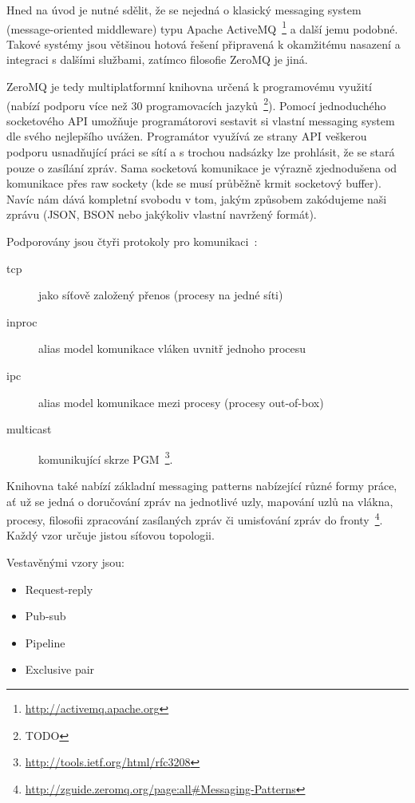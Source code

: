 \documentclass[thesis=M,czech]{FITthesis}[2014/05/07]
\begin{document}
Hned na úvod je nutné sdělit, že se nejedná o klasický messaging system (message-oriented middleware) typu Apache ActiveMQ~\footnote{\url{http://activemq.apache.org}} a další jemu podobné. Takové systémy jsou většinou hotová řešení připravená k okamžitému nasazení a integraci s dalšími službami, zatímco filosofie ZeroMQ je jiná.

ZeroMQ je tedy multiplatformní knihovna určená k programovému využití (nabízí podporu více než 30 programovacích jazyků~\footnote{TODO}). Pomocí jednoduchého socketového API umožňuje programátorovi sestavit si vlastní messaging system dle svého nejlepšího uvážen. Programátor využívá ze strany API veškerou podporu usnadňující práci se sítí a s trochou nadsázky lze prohlásit, že se stará pouze o zasílání zpráv. Sama socketová komunikace je výrazně zjednodušena od komunikace přes raw sockety (kde se musí průběžně krmit socketový buffer). Navíc nám dává kompletní svobodu v tom, jakým způsobem zakódujeme naši zprávu (JSON, BSON nebo jakýkoliv vlastní navržený formát).

Podporovány jsou čtyři protokoly pro komunikaci~\cite{zeromq1}:

\begin{description}
	\item[tcp] jako síťově založený přenos (procesy na jedné síti)
	\item[inproc] alias model komunikace vláken uvnitř jednoho procesu
	\item[ipc] alias model komunikace mezi procesy (procesy out-of-box)
	\item[multicast]	komunikující skrze PGM~\footnote{\url{http://tools.ietf.org/html/rfc3208}}.
\end{description}

Knihovna také nabízí základní messaging patterns nabízející různé formy práce, ať už se jedná o doručování zpráv na jednotlivé uzly, mapování uzlů na vlákna, procesy, filosofii zpracování zasílaných zpráv či umisťování zpráv do fronty~\footnote{\url{http://zguide.zeromq.org/page:all\#Messaging-Patterns}}. Každý vzor určuje jistou síťovou topologii.

Vestavěnými vzory jsou:

\begin{itemize}
	\item Request-reply
	\item Pub-sub
	\item Pipeline		
	\item Exclusive pair
\end{itemize}
\end{document}
